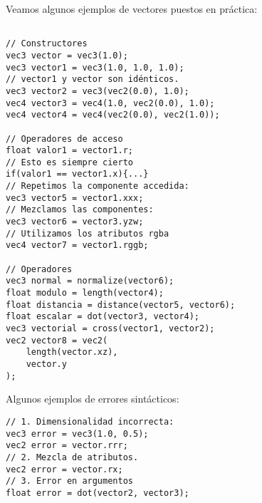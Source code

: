 Veamos algunos ejemplos de vectores puestos en práctica:

\begin{lstlisting}

// Constructores
vec3 vector = vec3(1.0);
vec3 vector1 = vec3(1.0, 1.0, 1.0);
// vector1 y vector son idénticos.
vec3 vector2 = vec3(vec2(0.0), 1.0);
vec4 vector3 = vec4(1.0, vec2(0.0), 1.0);
vec4 vector4 = vec4(vec2(0.0), vec2(1.0));

// Operadores de acceso
float valor1 = vector1.r;
// Esto es siempre cierto
if(valor1 == vector1.x){...}
// Repetimos la componente accedida:
vec3 vector5 = vector1.xxx;
// Mezclamos las componentes:
vec3 vector6 = vector3.yzw;
// Utilizamos los atributos rgba
vec4 vector7 = vector1.rggb;

// Operadores
vec3 normal = normalize(vector6);
float modulo = length(vector4);
float distancia = distance(vector5, vector6);
float escalar = dot(vector3, vector4);
vec3 vectorial = cross(vector1, vector2);
vec2 vector8 = vec2(
    length(vector.xz), 
    vector.y
);
\end{lstlisting}

Algunos ejemplos de errores sintácticos:
\begin{lstlisting}
// 1. Dimensionalidad incorrecta:
vec3 error = vec3(1.0, 0.5);
vec2 error = vector.rrr;
// 2. Mezcla de atributos.
vec2 error = vector.rx;
// 3. Error en argumentos
float error = dot(vector2, vector3);

\end{lstlisting}

